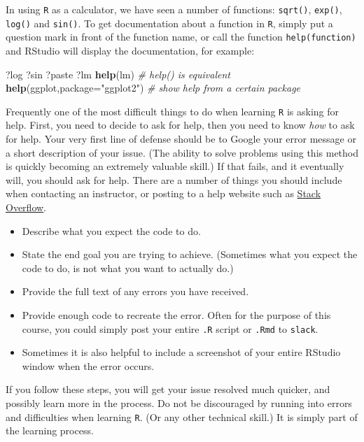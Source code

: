 \documentclass[]{book}
\newenvironment{Shaded}{\begin{snugshade}}{\end{snugshade}}
\newcommand{\KeywordTok}[1]{\textcolor[rgb]{0.13,0.29,0.53}{\textbf{#1}}}
\newcommand{\DataTypeTok}[1]{\textcolor[rgb]{0.13,0.29,0.53}{#1}}
\newcommand{\StringTok}[1]{\textcolor[rgb]{0.31,0.60,0.02}{#1}}
\newcommand{\CommentTok}[1]{\textcolor[rgb]{0.56,0.35,0.01}{\textit{#1}}}
\newcommand{\NormalTok}[1]{#1}
\providecommand{\tightlist}{%
  \setlength{\itemsep}{0pt}\setlength{\parskip}{0pt}}
\theoremstyle{definition}
\theoremstyle{definition}
\theoremstyle{definition}
\theoremstyle{remark}
\begin{document}
In using \texttt{R} as a calculator, we have seen a number of functions:
\texttt{sqrt()}, \texttt{exp()}, \texttt{log()} and \texttt{sin()}. To
get documentation about a function in \texttt{R}, simply put a question
mark in front of the function name, or call the function
\texttt{help(function)} and RStudio will display the documentation, for
example:

\begin{Shaded}
\begin{Highlighting}[]
\NormalTok{?log}
\NormalTok{?sin}
\NormalTok{?paste}
\NormalTok{?lm}
\KeywordTok{help}\NormalTok{(lm)   }\CommentTok{# help() is equivalent}
\KeywordTok{help}\NormalTok{(ggplot,}\DataTypeTok{package=}\StringTok{"ggplot2"}\NormalTok{)  }\CommentTok{# show help from a certain package}
\end{Highlighting}
\end{Shaded}

Frequently one of the most difficult things to do when learning
\texttt{R} is asking for help. First, you need to decide to ask for
help, then you need to know \emph{how} to ask for help. Your very first
line of defense should be to Google your error message or a short
description of your issue. (The ability to solve problems using this
method is quickly becoming an extremely valuable skill.) If that fails,
and it eventually will, you should ask for help. There are a number of
things you should include when contacting an instructor, or posting to a
help website such as \href{https://stackoverflow.com}{Stack Overflow}.

\begin{itemize}
\tightlist
\item
  Describe what you expect the code to do.
\item
  State the end goal you are trying to achieve. (Sometimes what you
  expect the code to do, is not what you want to actually do.)
\item
  Provide the full text of any errors you have received.
\item
  Provide enough code to recreate the error. Often for the purpose of
  this course, you could simply post your entire \texttt{.R} script or
  \texttt{.Rmd} to \texttt{slack}.
\item
  Sometimes it is also helpful to include a screenshot of your entire
  RStudio window when the error occurs.
\end{itemize}

If you follow these steps, you will get your issue resolved much
quicker, and possibly learn more in the process. Do not be discouraged
by running into errors and difficulties when learning \texttt{R}. (Or
any other technical skill.) It is simply part of the learning process.
\end{document}
